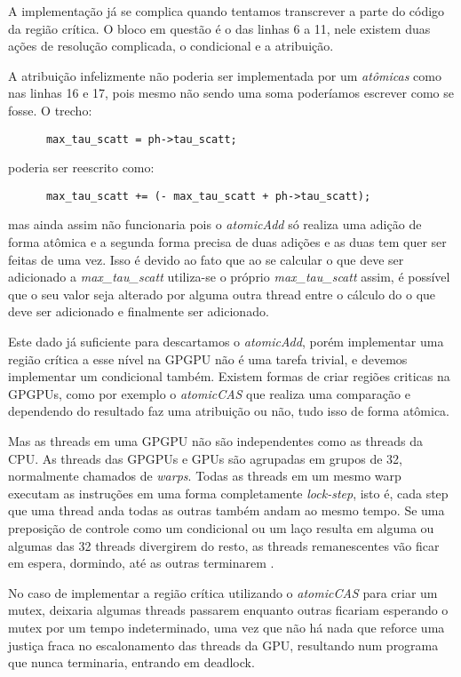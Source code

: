     A implementação já se complica quando tentamos transcrever a parte do código da região crítica. O bloco em questão é o das linhas 6 a 11, nele existem duas ações de resolução complicada, o condicional e a atribuição.

    A atribuição infelizmente não poderia ser implementada por um \textit{atômicas} como nas linhas 16 e 17, pois mesmo não sendo uma soma poderíamos escrever como se fosse. O trecho:
    \begin{lstlisting}
      max_tau_scatt = ph->tau_scatt;
    \end{lstlisting}

    poderia ser reescrito como:

    \begin{lstlisting}
      max_tau_scatt += (- max_tau_scatt + ph->tau_scatt);
    \end{lstlisting}

    mas ainda assim não funcionaria pois o \textit{atomicAdd} só realiza uma adição de forma atômica e a segunda forma precisa de duas adições e as duas tem quer ser feitas de uma vez. Isso é devido ao fato que ao se calcular o que deve ser adicionado a \textit{max\_tau\_scatt} utiliza-se o próprio \textit{max\_tau\_scatt} assim, é possível que o seu valor seja alterado por alguma outra thread entre o cálculo do o que deve ser adicionado e finalmente ser adicionado.

    Este dado já suficiente para descartamos o \textit{atomicAdd}, porém implementar uma região crítica a esse nível na GPGPU não é uma tarefa trivial, e devemos implementar um condicional também. Existem formas de criar regiões criticas na GPGPUs, como por exemplo o \textit{atomicCAS} que realiza uma comparação e dependendo do resultado faz uma atribuição ou não, tudo isso de forma atômica.

    Mas as threads em uma GPGPU não são independentes como as threads da CPU. As threads das GPGPUs e GPUs são agrupadas em grupos de 32, normalmente chamados de \textit{warps}. Todas as threads em um mesmo warp executam as instruções em uma forma completamente \textit{lock-step}, isto é, cada step que uma thread anda todas as outras também andam ao mesmo tempo. Se uma preposição de controle como um condicional ou um laço resulta em alguma ou algumas das 32 threads divergirem do resto, as threads remanescentes vão ficar em espera, dormindo, até as outras terminarem \citep{bestparccuda}.

    No caso de implementar a região crítica utilizando o \textit{atomicCAS} para criar um mutex, deixaria algumas threads passarem enquanto outras ficariam esperando o mutex por um tempo indeterminado, uma vez que não há nada que reforce uma justiça fraca no escalonamento das threads da GPU, resultando num programa que nunca terminaria, entrando em deadlock.

